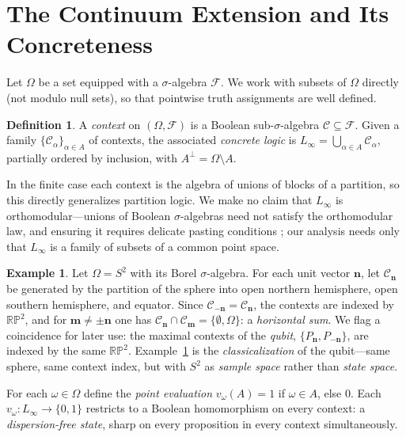 \documentclass[11pt]{article}
\theoremstyle{definition}
\newtheorem{definition}[theorem]{Definition}
\newtheorem{example}[theorem]{Example}
\theoremstyle{remark}
\newcommand{\F}{\mathcal{F}}
\newcommand{\C}{\mathcal{C}}
\newcommand{\Linf}{L_{\infty}}
\newcommand{\Om}{\Omega}
\begin{document}
\section{The Continuum Extension and Its Concreteness}\label{sec:extension}

Let $\Om$ be a set equipped with a $\sigma$-algebra $\F$. We work with
subsets of $\Om$ directly (not modulo null sets), so that pointwise
truth assignments are well defined.

\begin{definition}
A \emph{context} on $(\Om,\F)$ is a Boolean sub-$\sigma$-algebra
$\C\subseteq\F$. Given a family $\{\C_{\alpha}\}_{\alpha\in A}$ of
contexts, the associated \emph{concrete logic} is
$\Linf=\bigcup_{\alpha\in A}\C_{\alpha}$, partially ordered by
inclusion, with $A^{\perp}=\Om\setminus A$.
\end{definition}

In the finite case each context is the algebra of unions of blocks of a
partition, so this directly generalizes partition logic. We make no
claim that $\Linf$ is orthomodular---unions of Boolean
$\sigma$-algebras need not satisfy the orthomodular law, and ensuring it
requires delicate pasting conditions \cite{NavaraPtak1991}; our analysis
needs only that $\Linf$ is a family of subsets of a common point space.

\begin{example}\label{ex:sphere}
Let $\Om=S^{2}$ with its Borel $\sigma$-algebra. For each unit vector
$\mathbf{n}$, let $\C_{\mathbf n}$ be generated by the partition of the
sphere into open northern hemisphere, open southern hemisphere, and
equator. Since $\C_{-\mathbf n}=\C_{\mathbf n}$, the contexts are
indexed by $\mathbb{RP}^{2}$, and for $\mathbf m\neq\pm\mathbf n$ one
has $\C_{\mathbf n}\cap\C_{\mathbf m}=\{\emptyset,\Om\}$: a
\emph{horizontal sum}. We flag a coincidence for later use: the maximal
contexts of the \emph{qubit}, $\{P_{\mathbf n},P_{-\mathbf n}\}$, are
indexed by the same $\mathbb{RP}^{2}$. Example~\ref{ex:sphere} is the
\emph{classicalization} of the qubit---same sphere, same context index,
but with $S^{2}$ as \emph{sample space} rather than \emph{state space}.
\end{example}

For each $\omega\in\Om$ define the \emph{point evaluation}
$v_{\omega}(A)=1$ if $\omega\in A$, else $0$. Each
$v_{\omega}\colon\Linf\to\{0,1\}$ restricts to a Boolean homomorphism on
every context: a \emph{dispersion-free state}, sharp on every
proposition in every context simultaneously.
\end{document}
